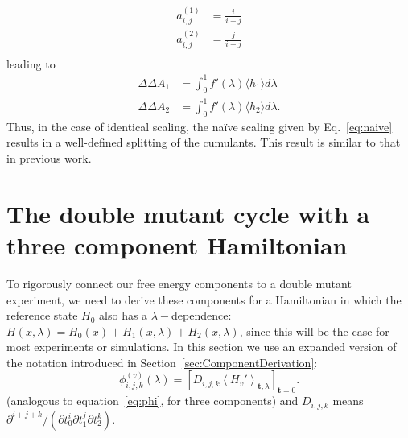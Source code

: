 \documentclass{article}
\let\vec\mathbf
\begin{document}
\begin{appendices}
\begin{align}
a_{i,j}^{(1)} &= \frac{i}{i+j} \nonumber\\
a_{i,j}^{(2)} &= \frac{j}{i+j} \nonumber\\
\label{eq:splitting}
\end{align}
leading to
\begin{equation}
\begin{split}
\Delta\Delta A_1 &= 
	\int_0^1 f'(\lambda)
    \langle h_1 \rangle 
    d\lambda \\
\Delta\Delta A_2 &= 
	\int_0^1 f'(\lambda)
    \langle h_2 \rangle
    d\lambda.
\end{split}
\end{equation}
Thus, in the case of identical scaling, the na\"ive scaling given by Eq.~\ref{eq:naive} results in a well-defined splitting of the cumulants. This result is similar to that in previous work.

\section{The double mutant cycle with a three component Hamiltonian}
\label{app:3components}
To rigorously connect our free energy components to a double mutant experiment, we need to derive these components for a Hamiltonian in which the reference state $H_0$ also has a $\lambda-$dependence: $H(x, \lambda) = H_0 (x) + H_1(x, \lambda) + H_2(x, \lambda)$, since this will be the case for most experiments or simulations.  In this section we use an expanded version of the notation introduced in Section~\ref{sec:ComponentDerivation}: 
\begin{equation}
\phi_{i,j,k}^{(v)}(\lambda) =
	\left[ D_{i,j,k} \left\langle
    	H_v'
    \right\rangle_{\vec t, \lambda} \right]_{\vec t=0}.
    \label{eq3:phi}
\end{equation}
(analogous to equation~\ref{eq:phi}, for three components) and $D_{i,j,k}$ means $\partial^{i+j+k} /(\partial t_0^i \partial t_1^j \partial t_2^k)$. 


\end{appendices}
\end{document}
